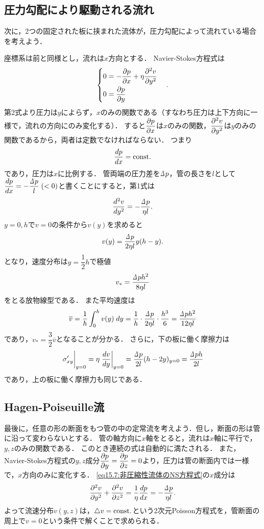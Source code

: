 \subsection*{圧力勾配により駆動される流れ}

次に，2つの固定された板に挟まれた流体が，圧力勾配によって流れている場合を考えよう．

座標系は前と同様とし，流れは$x$方向とする．
Navier-Stokes方程式は
\[
    \begin{cases}
        0 = - \dpdv{p}{x} + \eta \dpdv[2]{v}{y} \\[7pt]
        0 = \dpdv{p}{y}
    \end{cases} .
\]
第2式より圧力は$y$によらず，$x$のみの関数である（すなわち圧力は上下方向に一様で，流れの方向にのみ変化する）．
すると$\dpdv{p}{x}$は$x$のみの関数，$\dpdv[2]{v}{y}$は$y$のみの関数であるから，両者は定数でなければならない．
つまり
\[
    \dv{p}{x} = \mathrm{const.}
\]
であり，圧力は$x$に比例する．
管両端の圧力差を$\D p$，管の長さを$l$として$\ddv{p}{x}=-\dfrac{\D p}{l}\;(<0)$と書くことにすると，第1式は
\[
    \dv[2]{v}{y} = -\frac{\D p}{\eta l}.
\]
$y=0,h$で$v=0$の条件から$v(y)$を求めると
\begin{equation}
    v(y) = \frac{\D p}{2\eta l} y(h-y) .
\end{equation}
となり，速度分布は$y=\dfrac{1}{2}h$で極値
\[
    v_* = \frac{\D p h^2}{8\eta l}
\]
をとる放物線型である．
また平均速度は
\begin{equation}\label{eq17.5:圧力勾配により駆動される流れの平均流速}
    \overline{v} = \frac{1}{h} \int_0^h v(y)\; dy
    = \frac{1}{h} \cdot \frac{\D p}{2\eta l} \cdot \frac{h^3}{6} = \frac{\D p h^2}{12\eta l}
\end{equation}
であり，$v_* = \dfrac{3}{2}\overline{v}$となることが分かる．
さらに，下の板に働く摩擦力は
\begin{equation}
    \eval{\sigma_{xy}'}_{y=0} = \eta \eval{\dv{v}{y}}_{y=0} 
    = \frac{\D p}{2l} (h-2y)_{y=0} = \frac{\D p h}{2l} 
\end{equation}
であり，上の板に働く摩擦力も同じである．


\subsection*{Hagen-Poiseuille流}

最後に，任意の形の断面をもつ管の中の定常流を考えよう．但し，断面の形は管に沿って変わらないとする．
管の軸方向に$x$軸をとると，流れは$x$軸に平行で，$y,z$のみの関数である．
このとき連続の式は自動的に満たされる．
また，Navier-Stokes方程式の$y,z$成分$\dpdv{p}{y}=\dpdv{p}{z}=0$より，圧力は管の断面内では一様で，$x$方向のみに変化する．
\eqref{eq15.7:非圧縮性流体のNS方程式}の$x$成分は
\begin{equation}\label{eq17.7:管の中の定常流の方程式}
    \pdv[2]{v}{y} + \pdv[2]{v}{z} = \frac{1}{\eta} \dv{p}{x} = -\frac{\D p}{\eta l}.
\end{equation}
よって流速分布$v(y,z)$は，$\triangle v=\mathrm{const.}$という2次元Poisson方程式を，管断面の周上で$v=0$という条件で解くことで求められる．




